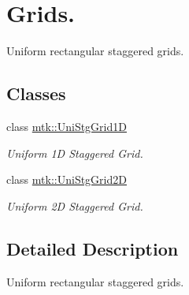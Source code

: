 \hypertarget{group__c06-grids}{\section{Grids.}
\label{group__c06-grids}
}


Uniform rectangular staggered grids.  


\subsection*{Classes}
\begin{DoxyCompactItemize}
\item 
class \hyperlink{classmtk_1_1UniStgGrid1D}{mtk\-::\-Uni\-Stg\-Grid1\-D}
\begin{DoxyCompactList}\small\item\em Uniform 1\-D Staggered Grid. \end{DoxyCompactList}\item 
class \hyperlink{classmtk_1_1UniStgGrid2D}{mtk\-::\-Uni\-Stg\-Grid2\-D}
\begin{DoxyCompactList}\small\item\em Uniform 2\-D Staggered Grid. \end{DoxyCompactList}\end{DoxyCompactItemize}


\subsection{Detailed Description}
Uniform rectangular staggered grids. 